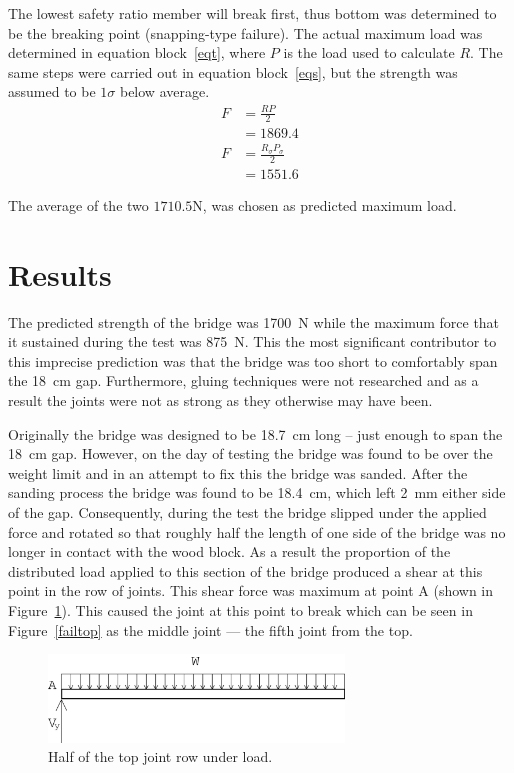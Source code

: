 \documentclass[12pt]{article}
\begin{document}
		The lowest safety ratio member will break first, thus bottom was determined to be the breaking point (snapping-type failure). The actual maximum load was determined in equation block~\ref{eqt}, where $P$ is the load used to calculate $R$. The same steps were carried out in equation block~\ref{eqs}, but the strength was assumed to be $1\sigma$ below average.
		\begin{subequations}
			\begin{align}
				F&=\frac{R P}{2} \\
				&=1869.4
			\end{align}
			\label{eqt}
		\end{subequations}
		\begin{subequations}
			\begin{align}
				F&=\frac{R_{\sigma} P_{\sigma}}{2} \\
				&=1551.6
			\end{align}
			\label{eqs}
		\end{subequations}

		The average of the two $1710.5\mathrm{N}$, was chosen as predicted maximum load.
	\section{Results}
The predicted strength of the bridge was 1700~N while the maximum force that it sustained during the test was 875~N. This the most significant contributor to this imprecise prediction was that the bridge was too short to comfortably span the 18~cm gap. Furthermore, gluing techniques were not researched and as a result the joints were not as strong as they otherwise may have been.

Originally the bridge was designed to be 18.7~cm long – just enough to span the 18~cm gap. However, on the day of testing the bridge was found to be over the weight limit and in an attempt to fix this the bridge was sanded. After the sanding process the bridge was found to be 18.4~cm, which left 2~mm either side of the gap. Consequently, during the test the bridge slipped under the applied force and rotated so that roughly half the length of one side of the bridge was no longer in contact with the wood block. As a result the proportion of the distributed load applied to this section of the bridge produced a shear at this point in the row of joints. This shear force was maximum at point A (shown in Figure~\ref{loadtop}). This caused the joint at this point to break which can be seen in Figure~\ref{failtop} as the middle joint --- the fifth joint from the top.
		\begin{figure}[h!]
			\centering
			\includegraphics[width=0.7\textwidth]{loadtop}
			\caption{Half of the top joint row under load.}
			\label{loadtop}
		\end{figure}
\end{document}
